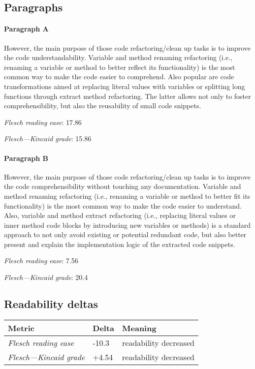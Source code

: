 \subsection{Paragraphs}
\paragraph{Paragraph A}
However, the main purpose of those code refactoring/clean up tasks is to improve the code understandability. Variable and method renaming refactoring (i.e., renaming a variable or method to better reflect its functionality) is the most common way to make the code easier to comprehend. Also popular are code transformations aimed at replacing literal values with variables or splitting long functions through extract method refactoring. The latter allows not only to foster comprehensibility, but also the reusability of small code snippets.\par\medskip
\emph{Flesch reading ease}: 17.86\par
\emph{Flesch---Kincaid grade}: 15.86

\paragraph{Paragraph B}
However, the main purpose of those code refactoring/clean up tasks is to improve the code comprehensibility without touching any documentation. Variable and method renaming refactoring (i.e., renaming a variable or method to better fit its functionality) is the most common way to make the code easier to understand. Also, variable and method extract refactoring (i.e., replacing literal values or inner method code blocks by introducing new variables or methods) is a standard approach to not only avoid existing or potential redundant code, but also better present and explain the implementation logic of the extracted code snippets.\par\medskip
\emph{Flesch reading ease}: 7.56\par
\emph{Flesch---Kincaid grade}: 20.4

\subsection{Readability deltas}

\begin{tabular}{lll}
\toprule
               \textbf{Metric} & \textbf{Delta} &       \textbf{Meaning} \\
\midrule
    \emph{Flesch reading ease} &          -10.3 &  readability decreased \\
 \emph{Flesch---Kincaid grade} &          +4.54 &  readability decreased \\
\bottomrule
\end{tabular}


